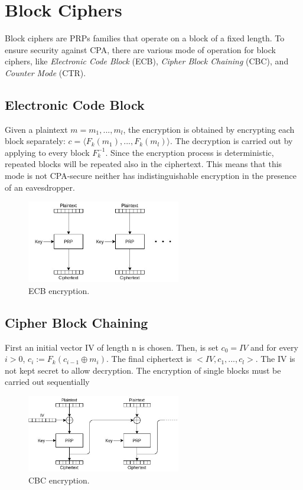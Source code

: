 \section{Block Ciphers}
\par
Block ciphers are PRPs families that operate on a block of a fixed length. To ensure security against CPA, there are various mode of operation for block ciphers, like \emph{Electronic Code Block} (ECB), \emph{Cipher Block Chaining} (CBC), and \emph{Counter Mode} (CTR).

\subsection{Electronic Code Block}
\par
Given a plaintext $m = m_1,...,m_l$, the encryption is obtained by encrypting each block separately: $c = \langle F_k(m_1),...,F_k(m_l) \rangle$.
The decryption is carried out by applying to every block $F_k^{-1}$. Since the encryption process is deterministic, repeated blocks will be repeated also in the ciphertext. This means that this mode is not CPA-secure neither has indistinguishable encryption in the presence of an eavesdropper.
\begin{figure}[H]
    \centering
    \includegraphics[width=0.6\textwidth]{img/private-key/ecb.jpg}
    \caption{ECB encryption.}
\end{figure}

\subsection{Cipher Block Chaining}
\par
First an initial vector IV of length n is chosen. Then, is set $c_0 = IV$ and for every $i > 0$, $c_i := F_k(c_{i-1} \oplus m_i)$. The final ciphertext is $<IV,c_1,...,c_l>$. The IV is not kept secret to allow decryption. The encryption of single blocks must be carried out sequentially
\begin{figure}[H]
    \centering
    \includegraphics[width=0.6\textwidth]{img/private-key/cbc.jpg}
    \caption{CBC encryption.}
\end{figure}

